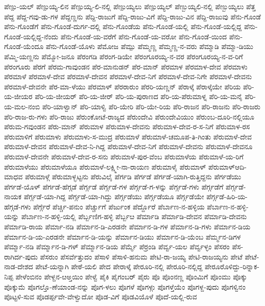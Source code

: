 ಪೆಣ್ಪು-ಯಲ್
ಪೆಣ್ಪುಯ್ಯ-ಲಿನ
ಪೆಣ್ಪುಯ್ಯ-ಲಿ-ನಲ್ಲಿ
ಪೆಣ್ಪುಯ್ಯಲು
ಪೆಣ್ಪುಯ್ಯಲ್
ಪೆಣ್ಬುಯ್ಯಲಿ-ನಲ್ಲಿ
ಪೆಣ್ಬುಯ್ಯಲು
ಪೆತ್ತ
ಪೆದ್ದ
ಪೆದ್ದ-ಗವು-ಡು-ಗಳ
ಪೆದ್ದಣ್ಣನು
ಪೆದ್ದಿ-ರಾಜುಗೆ
ಪೆದ್ದಿ-ರಾಜು-ವಿಗೆ
ಪೆದ್ದಿ-ರಾಜು-ವಿನ
ಪೆದ್ದಿ-ರಾಜುವು
ಪೆನು-ಗೊಂಡೆ
ಪೆನು-ಗೊಂಡೆಗೆ
ಪೆನು-ಗೊಂಡೆ-ದುರ್ಗ-ದಲ್ಲಿ
ಪೆನು-ಗೊಂಡೆಯ
ಪೆನು-ಗೊಂಡೆ-ಯಲ್ಲಿ
ಪೆನು-ಗೊಂಡೆ-ಯಲ್ಲಿದ್ದ
ಪೆನು-ಗೊಂಡೆ-ಯಲ್ಲಿದ್ದ-ನೆಂದು
ಪೆನು-ಗೊಂಡೆ-ಯ-ವರೆಗೆ
ಪೆನು-ಗೊಂಡೆ-ಯ-ವರೋ
ಪೆನು-ಗೊಂಡೆ-ಯಿಂದ
ಪೆನು-ಗೊಂಡೆ-ಯೆಂದೂ
ಪೆನು-ಗೊಂಡೆ-ಯೊಳು
ಪೆಮೋಜ
ಪೆಮ್ಪು
ಪೆಮ್ಮಣ್ಣ
ಪೆಮ್ಮಣ್ಣ-ನ-ವರು
ಪೆಮ್ಮಾಡಿ
ಪೆಮ್ಮಾ-ಡಿಯು
ಪೆಮ್ಮಿ-ಯಣ್ಣನು
ಪೆಮ್ಮೋ-ಜನೂ
ಪೆರಂಗಡಿ
ಪೆರಂಗ-ಡಿಯೇ
ಪೆರಂಗೂರಯ್ಯ-ನ-ವರ
ಪೆರಂಗೂರಯ್ಯ-ನ-ವ-ರಿಗೆ
ಪೆರಂಗೂರು
ಪೆರಗೆ
ಪೆರಮ-ಗಾವುಂಡನ
ಪೆರ-ಮಾನುಡನ್
ಪೆರ-ಮಾನ್
ಪೆರಮಾಳ
ಪೆರಮಾಳ-ದೇವ
ಪೆರಮಾಳು
ಪೆರಮಾಳೆ
ಪೆರಮಾಳೆ-ದೇವ
ಪೆರಮಾಳೆ-ದೇವನ
ಪೆರಮಾಳೆ-ದೇವ-ನಿಗೆ
ಪೆರಮಾಳೆ-ದೇವ-ನಿಗೇ
ಪೆರಮಾಳೆ-ದೇವನು
ಪೆರಮಾಳೆ-ದೇವನೇ
ಪೆರ-ಮಾ-ಳೆಯು
ಪೆರಮಾಳ್
ಪೆರರಾರುಂ
ಪೆರರಿ-ಯಣ್ಣನ್
ಪೆರಾಳ್ಕೆ
ಪೆರಾಳ್ಕೆಯೇ
ಪೆರಿಯ
ಪೆರಿ-ಯ-ಜೀಯರ
ಪೆರಿ-ಯ-ಜೀಯರ್
ಪೆರಿ-ಯ-ಜೀರ್
ಪೆರಿ-ಯ-ಪುರಾಣದ
ಪೆರಿ-ಯ-ಪೆರುಮಾಳ್ನ
ಪೆರಿ-ಯ-ಮನೈ
ಪೆರಿ-ಯ-ಮಲ-ನಂಬಿ
ಪೆರಿ-ಯಾಳ್ವಾನ್
ಪೆರಿ-ಯಾಳ್ವಿ
ಪೆರಿ-ಯೇರಿ
ಪೆರಿ-ಯೇ-ರಿಯ
ಪೆರಿ-ರಾಜನ
ಪೆರಿ-ರಾಜನು
ಪೆರಿ-ರಾಜರು
ಪೆರಿ-ರಾಜ-ರು-ಗಳು
ಪೆರಿ-ರಾಜು
ಪೆರುಂಕೋಟೆ-ರಾಜ್ಯದ
ಪೆರುಂದೇವಿ
ಪೆರುಂದೇವಿಯುಂ
ಪೆರುಂಬ-ದೂರಿ-ನಲ್ಲಿಯೂ
ಪೆರುಮ-ಗವುಂಡನ
ಪೆರು-ಮಾನ್
ಪೆರುಮಾಳ
ಪೆರುಮಾಳ-ದೇವನು
ಪೆರುಮಾಳ-ದೇವ-ರ-ಸ-ನಿಗೆ
ಪೆರುಮಾಳ-ರಸ
ಪೆರುಮಾಳಿಗೆ
ಪೆರುಮಾಳು
ಪೆರುಮಾಳು-ಸ-ಮುದ್ರ
ಪೆರುಮಾಳೆ
ಪೆರುಮಾಳೆ-ಚಮೂಪ-ತಿ-ಗಿಂತು
ಪೆರುಮಾಳೆ-ದೇವ
ಪೆರುಮಾಳೆ-ದೇವನ
ಪೆರುಮಾಳೆ-ದೇವ-ನಿ-ಗಿದ್ದ
ಪೆರುಮಾಳೆ-ದೇವ-ನಿಗೆ
ಪೆರುಮಾಳೆ-ದೇವನು
ಪೆರುಮಾಳೆ-ದೇವನೂ
ಪೆರುಮಾಳೆ-ದೇವನೇ
ಪೆರುಮಾಳೆ-ದೇವ-ರ-ಸನು
ಪೆರುಮಾಳೆ-ಪುರ-ವೆಂಬ
ಪೆರುಮಾಳೆಯ
ಪೆರುಮಾಳೆ-ಯ-ರಿಗೆ
ಪೆರುಮಾಳೆಯು
ಪೆರುಮಾಳೆಯೂ
ಪೆರುಮಾಳೆ-ಲಕ್ಷ್ಮೀ-ನಾ-ರಾಯಣ
ಪೆರುಮಾಳೈ
ಪೆರುಮಾಳ್
ಪೆರುಮಾಳ್ಆದಿ-ಮಾಧವ
ಪೆರುಮಾಳ್ಗೆ
ಪೆರುಮಾಳ್ಭಟ್ಟನು
ಪೆರುವಿಲೈ
ಪೆರ್ಗಡಿ
ಪೆರ್ಗಡೆ
ಪೆರ್ಗಡೆ-ಯಾಗಿ-ರುತ್ತಿದ್ದನು
ಪೆರ್ಗಡೆಯು
ಪೆರ್ಗಡೆ-ಯೊಳ್
ಪೆರ್ಗಡೆ-ಹೆಗ್ಗಡೆ
ಪೆರ್ಗ್ಗಡೆ
ಪೆರ್ಗ್ಗಡೆ-ಗಳ
ಪೆರ್ಗ್ಗಡೆ-ಗ-ಳನ್ನು
ಪೆರ್ಗ್ಗಡೆ-ಗಳು
ಪೆರ್ಗ್ಗಡೆಗೆ
ಪೆರ್ಗ್ಗಡೆ-ನಾಯಕ
ಪೆರ್ಗ್ಗಡೆ-ಯಾ-ಗಿದ್ದ
ಪೆರ್ಗ್ಗಡೆ-ಯಾ-ಗಿದ್ದು
ಪೆರ್ಗ್ಗಡೆಯು
ಪೆರ್ಗ್ಗಡೆಯೂ
ಪೆರ್ಗ್ಗಡೆಯೇ
ಪೆರ್ಗ್ಗಡೆ-ಹಿರಿ-ಯ-ಹೆಗ್ಗಡೆ-ಗಳು
ಪೆರ್ಗ್ಗೆರೆ
ಪೆರ್ಚ್ಚಿ-ಪನುಂ
ಪೆರ್ಚ್ಚುಗೆ
ಪೆರ್ಜುಂಕ
ಪೆರ್ದ್ದೊರೆ
ಪೆರ್ಬಾಣ-ನ-ಹಳ್ಳಿಯ
ಪೆರ್ಬಾಣ-ನ-ಹಳ್ಳಿ-ಯನ್ನು
ಪೆರ್ಬಾಣ-ನ-ಹಳ್ಳಿ-ಯಲ್ಲಿ
ಪೆರ್ಬ್ಬಣಿಗ-ಹಳ್ಳಿ
ಪೆರ್ಬ್ಬೞ
ಪೆರ್ಮಾಡಿ
ಪೆರ್ಮಾಡಿ-ದೇವನ
ಪೆರ್ಮಾಡಿ-ದೇವನು
ಪೆರ್ಮಾಡಿ-ರಾಯ
ಪೆರ್ಮಾ-ನಡಿ
ಪೆರ್ಮಾನ-ಡಿ-ಎರಡನೇ
ಪೆರ್ಮಾನ-ಡಿ-ಗಳ
ಪೆರ್ಮಾನ-ಡಿ-ಗಳು
ಪೆರ್ಮಾನ-ಡಿಯ
ಪೆರ್ಮಾನ-ಡಿ-ಯ-ಎರಡನೇ
ಪೆರ್ಮಾನ-ಡಿ-ಯನ್ನು
ಪೆರ್ಮಾನ-ಡಿಯು
ಪೆರ್ಮಾನ-ಡಿ-ಯೆಂಬ
ಪೆರ್ಮ್ಮನ-ಡಿಗಳ
ಪೆರ್ಮ್ಮಾ-ನಡಿ
ಪೆರ್ಮ್ಮಾನ-ಡಿ-ಗಳ್
ಪೆರ್ಮ್ಮಾನ-ಡಿಯ
ಪೆರ್ಮ್ಮೆ
ಪೆರ್ರಂಡಿ
ಪೆರ್ವ್ವ-ಯಲ
ಪೆರ್ವ್ವಳ್ಳಂ
ಪೆಸರಂ
ಪೆಸ-ರಾಗಿರ್ದ-ಪುದು
ಪೆಸರುಂ
ಪೆಸರ್ವೆತ್ತುದಂ
ಪೆಸಾಳಿ
ಪೆಸಾಳಿ-ಹನುಮ
ಪೇಟಿ-ರಾ-ಜಯ್ಯ
ಪೇಟಿ-ರಾಜಯ್ಯನು
ಪೇಟೆ
ಪೇಟೆ-ನಾಡ-ದೇಶದ
ಪೇಟೆ-ಯನ್ನಾಗಿ
ಪೇಠೆ-ಯಲಿ
ಪೇದ
ಪೇರಾಳ್ಕೆ
ಪೇರೂರಿ-ನಲ್ಲಿ
ಪೇರೂರಿ-ನಲ್ಲಿದ್ದ
ಪೇರೂರೊಳಿದ್ದು-ರಿನ್ನಾಕ-ನಿಪ್ಪ
ಪೇಳೆಂಬಿನಂ
ಪೇಳ್ದನ-ೞಅ್ತಯಿಂ
ಪೇಳ್ವೆ
ಪೈಕಿ
ಪೈಗಂಬರ್
ಪೈರು
ಪೊ
ಪೊಂನಣ್ಣ
ಪೊಂಮಿಗೆ
ಪೊಂಮು
ಪೊಕ್ಕು
ಪೊಕ್ಕುಮೆ
ಪೊಗಲ್ತೊ-ಣೆಯಾಂಡ-ನನ್ನು
ಪೊಗ-ಳಲು
ಪೊಗಳೆ
ಪೊಗಳ್ಗು
ಪೊಗಳ್ತೆಯೆಂ
ಪೊಗಳ್ದ-ಪುದು
ಪೊಗಳ್ವಿನಂ
ಪೊಟ್ಟಳಿ-ಸುವ
ಪೊಡರ್ಪ್ಪವೇ-ವೇಳ್ವುದೋ
ಪೊಡ-ವಿಗೆ
ಪೊಡವಿಯೊಳೆ
ಪೊದೆ-ಯಲ್ಲಿ-ರುವ
